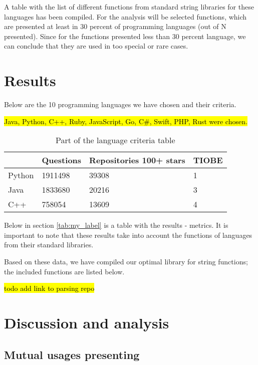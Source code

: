 \documentclass[anonymous,sigplan,review,11pt,nonacm,natbib=false]{acmart}
\begin{document}
    A table with the list of different functions from standard string libraries for these languages has been compiled. For the analysis will be selected functions, which are presented at least in 30 percent of programming languages (out of N presented). Since for the functions presented less than 30 percent language, we can conclude that they are used in too special or rare cases.



    \section{Results}

    Below are the 10 programming languages we have chosen and their criteria.

    \hl{Java, Python, C++, Ruby, JavaScript, Go, C\#, Swift, PHP, Rust were chosen.}

    \begin{table}[h]
        \begin{tabular}{llll}
            \hline
            & Questions
            & Repositories 100+ stars
            & TIOBE
            \\ \hline

            Python & 1911498 & 39308 & 1 \\

            Java & 1833680 & 20216 & 3 \\

            C++ & 758054 & 13609 & 4 \\ \hline
        \end{tabular}
        \caption{Part of the language criteria table}
    \end{table}

    Below in section \ref{tab:my_label} is a table with the results - metrics. It is important to note that these results take into account the functions of languages from their standard libraries.

    Based on these data, we have compiled our optimal library for string functions; the included functions are listed below.

    \hl{todo add link to parsing repo}

    \section{Discussion and analysis}

    \subsection{Mutual usages presenting}
\end{document}
